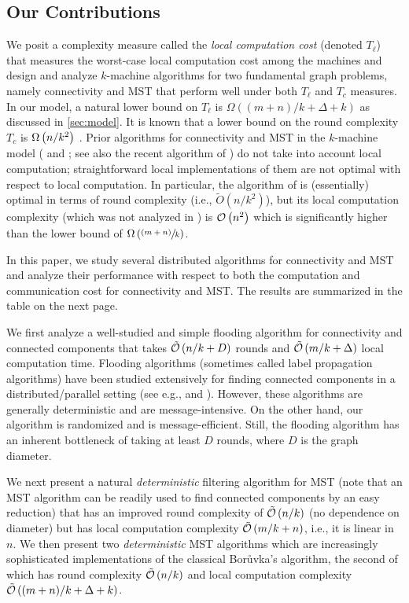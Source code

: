 \subsection{Our Contributions}
We posit a complexity measure called the \emph{local computation cost} (denoted \(T_{\ell}\)) that measures the worst-case local computation
cost among the machines and design and analyze $k$-machine algorithms for two fundamental graph problems, namely connectivity and MST that perform well
under both $T_{\ell}$ and $T_c$ measures. In our model, a natural lower bound on 
\(T_{\ell}\) is $\Omega((m+n)/k + \Delta + k)$ as discussed in \cref{sec:model}.
It is known that a lower bound on the round complexity \(T_c\) is \(\Omega\left(n/k^2\right)\) \cite{KlauckNPR15}. Prior algorithms for connectivity and MST in the $k$-machine model (\cite{KlauckNPR15} and \cite{topc18}; see also the recent algorithm of \cite{gilbert}) do not take into account local computation; straightforward local implementations of them
are not optimal with respect to local computation.  In particular, the algorithm of \cite{topc18} is (essentially) optimal in terms of round complexity (i.e., $\tilde{O}(n/k^2)$),
but its local computation complexity (which was not analyzed in \cite{topc18})  is $\mathcal{O}\left(n^2\right)$ which is significantly higher than the lower bound of  \(\Omega\left(\sfrac{(m+n)}{k}\right)\).

In this paper, we study several
distributed algorithms for connectivity and MST  and analyze their performance with respect to both the computation
and communication cost for connectivity and MST. The results are summarized in the table on the next page.

We first analyze a well-studied and simple flooding algorithm  for connectivity and connected components that takes \(\tilde{\mathcal{O}}\left(n/k+ D\right)\) rounds and \(\tilde{\mathcal{O}}\left(m/k + \Delta\right)\) local computation time. Flooding algorithms (sometimes called label propagation algorithms) have been studied extensively for finding connected components in a distributed/parallel setting (see e.g., \cite{TianBCTM13} and \cite{aluru}).
However, these algorithms are generally deterministic and are message-intensive. On the
other hand, our algorithm is randomized and is message-efficient. Still, the flooding algorithm
has an inherent bottleneck of taking at least $D$ rounds, where $D$ is the graph diameter.

We next present a natural \emph{deterministic} filtering algorithm for MST (note
that an MST algorithm can be readily used to find connected components by an easy reduction) that has
an improved round complexity of \(\tilde{\mathcal{O}}\left(n/k\right)\) (no dependence on diameter) but has local computation complexity
\(\tilde{\mathcal{O}}\left(m/k + n\right)\), i.e., it is linear in $n$. We then present two \emph{deterministic} MST algorithms which are increasingly sophisticated implementations of the classical Bor\r{u}vka's algorithm, the second of which
has round complexity \(\tilde{\mathcal{O}}\left(n/k\right)\) and local computation complexity \(\tilde{\mathcal{O}}\left((m+n)/k + \Delta + k\right)\).

